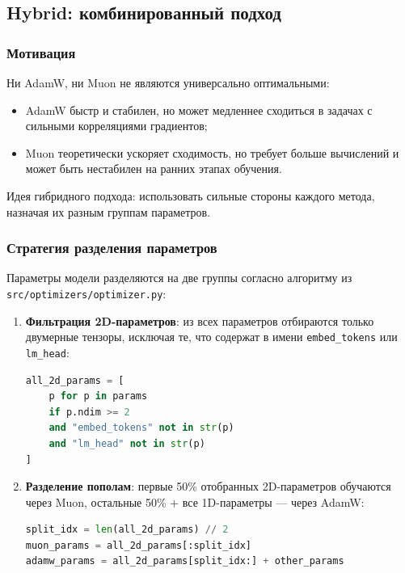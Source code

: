 \documentclass[a4paper,12pt]{article}
\begin{document}
\subsection{Hybrid: комбинированный подход}

\subsubsection{Мотивация}

Ни AdamW, ни Muon не являются универсально оптимальными:
\begin{itemize}
    \item AdamW быстр и стабилен, но может медленнее сходиться в задачах с сильными корреляциями градиентов;
    \item Muon теоретически ускоряет сходимость, но требует больше вычислений и может быть нестабилен на ранних этапах обучения.
\end{itemize}

Идея гибридного подхода: использовать сильные стороны каждого метода, назначая их разным группам параметров.

\subsubsection{Стратегия разделения параметров}

Параметры модели разделяются на две группы согласно алгоритму из \texttt{src/optimizers/optimizer.py}:

\begin{enumerate}
    \item \textbf{Фильтрация 2D-параметров}: из всех параметров отбираются только двумерные тензоры, исключая те, что содержат в имени \texttt{embed\_tokens} или \texttt{lm\_head}:
    \begin{lstlisting}[language=Python]
all_2d_params = [
    p for p in params
    if p.ndim >= 2 
    and "embed_tokens" not in str(p) 
    and "lm_head" not in str(p)
]
    \end{lstlisting}
    
    \item \textbf{Разделение пополам}: первые 50\% отобранных 2D-параметров обучаются через Muon, остальные 50\% + все 1D-параметры --- через AdamW:
    \begin{lstlisting}[language=Python]
split_idx = len(all_2d_params) // 2
muon_params = all_2d_params[:split_idx]
adamw_params = all_2d_params[split_idx:] + other_params
    \end{lstlisting}
\end{enumerate}
\end{document}
